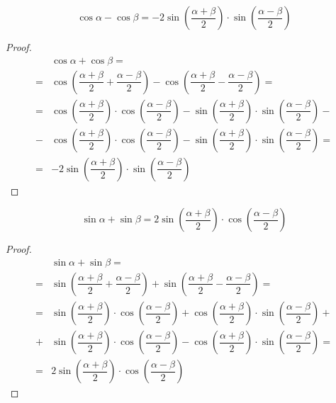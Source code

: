 \documentclass[12pt]{article}
\begin{document}
    \begin{statement}
        $$\cos\alpha-\cos\beta=-2\sin\left(\dfrac{\alpha+\beta}{2}\right)\cdot\sin\left(\dfrac{\alpha-\beta}{2}\right)$$
    \end{statement}
    \begin{proof}
        \begin{align*}
            &\cos\alpha+\cos\beta=\\
            =&\cos\left(\dfrac{\alpha+\beta}{2}+\dfrac{\alpha-\beta}{2}\right)-\cos\left(\dfrac{\alpha+\beta}{2}-\dfrac{\alpha-\beta}{2}\right)=\\
            =&\cos\left(\dfrac{\alpha+\beta}{2}\right)\cdot\cos\left(\dfrac{\alpha-\beta}{2}\right)-\sin\left(\dfrac{\alpha+\beta}{2}\right)\cdot\sin\left(\dfrac{\alpha-\beta}{2}\right)-\\
            -&\cos\left(\dfrac{\alpha+\beta}{2}\right)\cdot\cos\left(\dfrac{\alpha-\beta}{2}\right)-\sin\left(\dfrac{\alpha+\beta}{2}\right)\cdot\sin\left(\dfrac{\alpha-\beta}{2}\right)=\\
            =&-2\sin\left(\dfrac{\alpha+\beta}{2}\right)\cdot\sin\left(\dfrac{\alpha-\beta}{2}\right)
        \end{align*}
    \end{proof}
    \begin{statement}
        $$\sin\alpha+\sin\beta=2\sin\left(\dfrac{\alpha+\beta}{2}\right)\cdot\cos\left(\dfrac{\alpha-\beta}{2}\right)$$
    \end{statement}
    \begin{proof}
        \begin{align*}
            &\sin\alpha+\sin\beta=\\
            =&\sin\left(\dfrac{\alpha+\beta}{2}+\dfrac{\alpha-\beta}{2}\right)+\sin\left(\dfrac{\alpha+\beta}{2}-\dfrac{\alpha-\beta}{2}\right)=\\
            =&\sin\left(\dfrac{\alpha+\beta}{2}\right)\cdot\cos\left(\dfrac{\alpha-\beta}{2}\right)+\cos\left(\dfrac{\alpha+\beta}{2}\right)\cdot\sin\left(\dfrac{\alpha-\beta}{2}\right)+\\
            +&\sin\left(\dfrac{\alpha+\beta}{2}\right)\cdot\cos\left(\dfrac{\alpha-\beta}{2}\right)-\cos\left(\dfrac{\alpha+\beta}{2}\right)\cdot\sin\left(\dfrac{\alpha-\beta}{2}\right)=\\
            =&2\sin\left(\dfrac{\alpha+\beta}{2}\right)\cdot\cos\left(\dfrac{\alpha-\beta}{2}\right)
        \end{align*}
    \end{proof}
\end{document}

